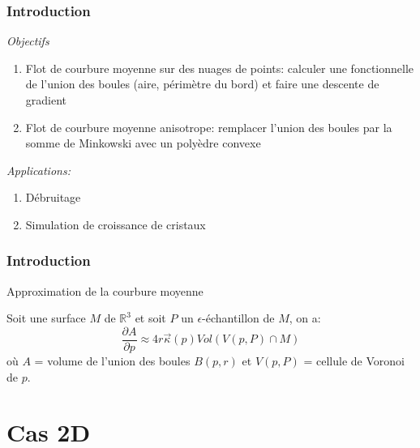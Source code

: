 \documentclass{beamer}
\begin{document}
\begin{frame}
    \frametitle{Introduction}

    \emph{Objectifs}
    \begin{enumerate}
        \item Flot de courbure moyenne sur des nuages de points: calculer une
            fonctionnelle de l'union des boules (aire, périmètre du bord) et
            faire une descente de gradient
        \item Flot de courbure moyenne anisotrope: remplacer l'union des boules
            par la somme de Minkowski avec un polyèdre convexe
    \end{enumerate}

    \emph{Applications:}
    \begin{enumerate}
        \item Débruitage
        \item Simulation de croissance de cristaux
    \end{enumerate}
\end{frame}

\begin{frame}
    \frametitle{Introduction}

    Approximation de la courbure moyenne
    \begin{theorem}
        Soit une surface $ M $ de $ \mathbb{R}^3 $ et soit $ P $ un
        $\epsilon$-échantillon de $ M $, on a:
        $$ \frac{\partial A}{\partial p} \approx 4 r \vec{\kappa}(p) Vol(V(p, P) \cap
        M) $$
        où $ A $  = volume de l'union des boules $ B(p, r) $ et $ V(p, P) $ =
        cellule de Voronoi de $ p $.
    \end{theorem}
\end{frame}

\section{Cas 2D}
\end{document}
